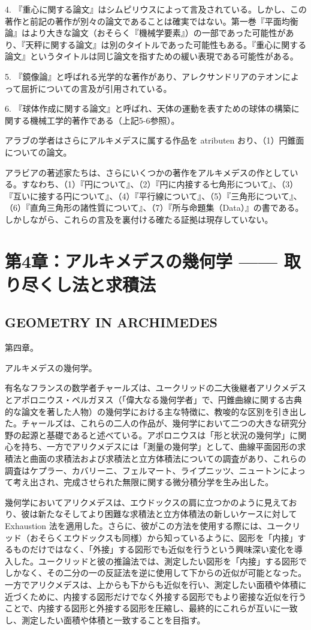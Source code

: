 \documentclass[a4paper,11pt,openany]{ltjsbook}
\begin{document}
4. 『重心に関する論文』はシムピリウスによって言及されている。しかし、この著作と前記の著作が別々の論文であることは確実ではない。第一巻『平面均衡論』はより大きな論文（おそらく『機械学要素』）の一部であった可能性があり、『天秤に関する論文』は別のタイトルであった可能性もある。『重心に関する論文』というタイトルは同じ論文を指すための緩い表現である可能性がある。

5. 『鏡像論』と呼ばれる光学的な著作があり、アレクサンドリアのテオンによって屈折についての言及が引用されている。

6. 『球体作成に関する論文』と呼ばれ、天体の運動を表すための球体の構築に関する機械工学的著作である（上記5-6参照）。

アラブの学者はさらにアルキメデスに属する作品を atributen おり、（1）円錐面についての論文。

アラビアの著述家たちは、さらにいくつかの著作をアルキメデスの作としている。すなわち、（1）『円について』、（2）『円に内接する七角形について』、（3）『互いに接する円について』、（4）『平行線について』、（5）『三角形について』、（6）『直角三角形の諸性質について』、（7）『所与命題集（Data）』の書である。しかしながら、これらの言及を裏付ける確たる証拠は現存していない。

\clearpage

\chapter{第4章：アルキメデスの幾何学 —— 取り尽くし法と求積法}
\section*{GEOMETRY IN ARCHIMEDES}

第四章。

アルキメデスの幾何学。

有名なフランスの数学者チャールズは、ユークリッドの二大後継者アリクメデスとアポロニウス・ペルガヌス（「偉大なる幾何学者」で、円錐曲線に関する古典的な論文を著した人物）の幾何学における主な特徴に、教唆的な区別を引き出した。チャールズは、これらの二人の作品が、幾何学において二つの大きな研究分野の起源と基礎であると述べている。アポロニウスは「形と状況の幾何学」に関心を持ち、一方でアリクメデスには「測量の幾何学」として、曲線平面図形の求積法と曲面の求積法および求積法と立方体積法についての調査があり、これらの調査はケプラー、カバリーニ、フェルマート、ライプニッツ、ニュートンによって考え出され、完成させられた無限に関する微分積分学を生み出した。

幾何学においてアリクメデスは、エウドックスの肩に立つかのように見えており、彼は新たなそしてより困難な求積法と立方体積法の新しいケースに対して Exhaustion 法を適用した。さらに、彼がこの方法を使用する際には、ユークリッド（おそらくエウドックスも同様）から知っているように、図形を「内接」するものだけではなく、「外接」する図形でも近似を行うという興味深い変化を導入した。ユークリッドと彼の推論法では、測定したい図形を「内接」する図形でしかなく、その二分の一の反証法を逆に使用して下からの近似が可能となった。一方でアリクメデスは、上からも下からも近似を行い、測定したい面積や体積に近づくために、内接する図形だけでなく外接する図形でもより密接な近似を行うことで、内接する図形と外接する図形を圧縮し、最終的にこれらが互いに一致し、測定したい面積や体積と一致することを目指す。
\end{document}
